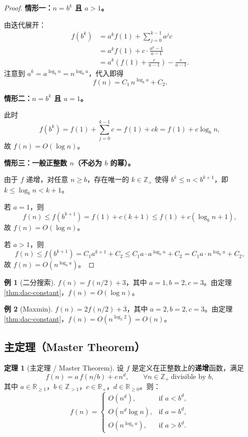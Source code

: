\documentclass[UTF8,11pt,a4paper]{ctexbook}   %
\theoremstyle{definition}
\newtheorem{theorem}{定理}[section]
\newtheorem{example}{例}[section]
\begin{document}
\begin{proof}
\textbf{情形一：$n=b^k$ 且 $a>1$。}

由迭代展开：
\begin{align*}
f(b^k) &= a^k f(1) + \sum_{j=0}^{k-1} a^j c\\
&= a^k f(1) + c\cdot\frac{a^k - 1}{a-1}\\
&= a^k\left(f(1) + \frac{c}{a-1}\right) - \frac{c}{a-1}.
\end{align*}
注意到 $a^k = a^{\log_b n} = n^{\log_b a}$，代入即得
\[
f(n) = C_1\,n^{\log_b a} + C_2.
\]

\textbf{情形二：$n=b^k$ 且 $a=1$。}

此时
\[
f(b^k) = f(1) + \sum_{j=0}^{k-1} c = f(1) + ck = f(1) + c\log_b n,
\]
故 $f(n) = O(\log n)$。

\textbf{情形三：一般正整数 $n$（不必为 $b$ 的幂）。}

由于 $f$ 递增，对任意 $n\ge b$，存在唯一的 $k\in\mathbb{Z}_+$ 使得 $b^k \le n < b^{k+1}$，即 $k \le \log_b n < k+1$。

若 $a=1$，则
\[
f(n) \le f(b^{k+1}) = f(1) + c(k+1) \le f(1) + c(\log_b n + 1),
\]
故 $f(n) = O(\log n)$。

若 $a>1$，则
\[
f(n) \le f(b^{k+1}) = C_1 a^{k+1} + C_2 \le C_1 a\cdot a^{\log_b n} + C_2 = C_1 a\cdot n^{\log_b a} + C_2,
\]
故 $f(n) = O(n^{\log_b a})$。
\end{proof}

\begin{example}[二分搜索]
$f(n) = f(n/2) + 3$，其中 $a=1,b=2,c=3$。由定理 \ref{thm:dac-constant}，$f(n) = O(\log n)$。
\end{example}

\begin{example}[Maxmin]
$f(n) = 2f(n/2) + 3$，其中 $a=2,b=2,c=3$。由定理 \ref{thm:dac-constant}，$f(n) = O(n^{\log_2 2}) = O(n)$。
\end{example}

\subsection{主定理（Master Theorem）}

\begin{theorem}[主定理 / Master Theorem]\label{thm:master}
设 $f$ 是定义在正整数上的\textbf{递增}函数，满足
\[
f(n) = a\,f(n/b) + c\,n^d,\qquad \forall n\in\mathbb{Z}_+\ \text{divisible by } b,
\]
其中 $a\in\mathbb{R}_{\ge 1}$，$b\in\mathbb{Z}_{>1}$，$c\in\mathbb{R}_+$，$d\in\mathbb{R}_{\ge 0}$。则：
\[
f(n) =
\begin{cases}
O(n^d), & \text{if } a < b^d,\\[0.5em]
O(n^d \log n), & \text{if } a = b^d,\\[0.5em]
O(n^{\log_b a}), & \text{if } a > b^d.
\end{cases}
\]
\end{theorem}
\end{document}
